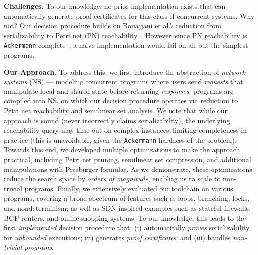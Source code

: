 \smallskip
\noindent
\textbf{Challenges.}
To our knowledge, no prior implementation exists that can automatically generate proof certificates for this class of concurrent systems.
Why not?
Our decision procedure builds on Bouajjani et al.'s reduction from serializability to Petri net (PN) reachability~\cite{BoEmEnHa13}. However, since PN reachability is \texttt{Ackermann}-complete~\cite{CzWo22}, a naive implementation would fail on all but the simplest programs. 

\smallskip
\noindent
\textbf{Our Approach.}
To address this, we first introduce the abstraction of \textit{network systems} (NS) --- modeling concurrent programs where users send \textit{requests} that manipulate local and shared state before returning \textit{responses}. \toolname{} programs are compiled into NS, on which our decision procedure operates via reduction to Petri net reachability and semilinear set analysis.
%
We note that while our approach is sound (never incorrectly claims serializability), the underlying reachability query may time out on complex instances, limiting completeness in practice (this is unavoidable, given the \texttt{Ackermann}-hardness of the problem).
%
Towards this end, we developed multiple optimizations to make the approach practical, including Petri net pruning, semilinear set compression, and additional manipulations with Presburger formulas.
As we demonstrate, these optimizations reduce the search space by \textit{orders of magnitude}, enabling us to scale to non-trivial programs.
%
Finally, 
we extensively evaluated our \toolname{} toolchain on various programs, covering a broad spectrum of features such as loops, branching, locks, and nondeterminism; as well as SDN-inspired examples such as stateful firewalls, BGP routers, and online shopping systems.
%
To our knowledge, this leads to the first \emph{implemented} decision procedure that: (i) automatically \textit{proves} serializability for \textit{unbounded} executions; (ii) generates \textit{proof certificates}; and (iii) handles \textit{non-trivial programs}.


